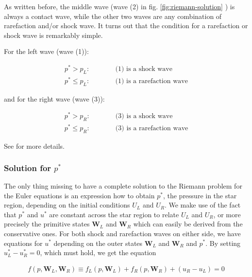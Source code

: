 As written before, the middle wave (wave (2) in fig. \ref{fig:riemann-solution} ) is always a contact wave, while the other two waves are any combination of rarefaction and/or shock wave.
It turns out that the condition for a rarefaction or shock wave is remarkably simple.

For the left wave (wave (1)):

\begin{align}
	p^* > p_L: && &\quad \text{ (1) is a shock wave}\\
	p^* \leq p_L: && &\quad \text{ (1) is a rarefaction wave}
\end{align}

and for the right wave (wave (3)):

\begin{align}
	p^* > p_R: && & \quad \text{ (3) is a shock wave} \\
	p^* \leq p_R: && & \quad \text{ (3) is a rarefaction wave} 
\end{align}

See \cite{toro} for more details.










\subsubsection{Solution for $p^*$}

The only thing missing to have a complete solution to the Riemann problem for the Euler equations is an expression how to obtain $p^*$, the pressure in the star region, depending on the initial conditions $U_L$ and $U_R$.
We make use of the fact that $p^*$ and $u^*$ are constant across the star region to relate $U_L$ and $U_R$, or more precisely the primitive states $\mathbf{W}_L$ and $\mathbf{W}_R$ which can easily be derived from the conservative ones.
For both shock and rarefaction waves on either side, we have equations for $u^*$ depending on the outer states  $\mathbf{W}_L$ and $\mathbf{W}_R$ and $p^*$.
By setting $u^*_L - u^*_R = 0$, which must hold, we get the equation

\begin{align}
	f(p, \mathbf{W}_L, \mathbf{W}_R) \equiv f_L(p, \mathbf{W}_L) + f_R(p, \mathbf{W}_R) + (u_R - u_L) = 0
\end{align}

